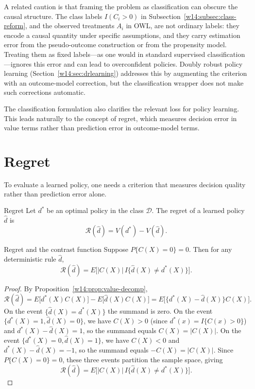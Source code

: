 \documentclass[master.tex]{subfiles}
\begin{document}
A related caution is that framing the problem as classification can obscure the causal structure. The class labels \(I(C_i>0)\) in Subsection~\ref{w14:subsec:class-reform}, and the observed treatments \(A_i\) in OWL, are not ordinary labels: they encode a causal quantity under specific assumptions, and they carry estimation error from the pseudo-outcome construction or from the propensity model. Treating them as fixed labels---as one would in standard supervised classification---ignores this error and can lead to overconfident policies. Doubly robust policy learning (Section~\ref{w14:sec:drlearning}) addresses this by augmenting the criterion with an outcome-model correction, but the classification wrapper does not make such corrections automatic.

The classification formulation also clarifies the relevant loss for policy learning. This leads naturally to the concept of regret, which measures decision error in value terms rather than prediction error in outcome-model terms.

\section{Regret}
\label{w14:sec:regret}

To evaluate a learned policy, one needs a criterion that measures decision quality rather than prediction error alone.

\begin{defn}{Regret}
\label{w14:defn:regret}
Let \(d^\ast\) be an optimal policy in the class \(\mathcal D\). The regret of a learned policy \(\hat d\) is
\[
\mathcal R(\hat d)=V(d^\ast)-V(\hat d).
\]
\end{defn}

\begin{prop}{Regret and the contrast function}
\label{w14:prop:regret-contrast}
Suppose \(P\{C(X)=0\}=0\). Then for any deterministic rule \(\hat d\),
\[
\mathcal R(\hat d)=E\bigl[|C(X)|\,I\{\hat d(X)\neq d^\ast(X)\}\bigr].
\]
\end{prop}

\begin{proof}
By Proposition~\ref{w14:prop:value-decomp},
\[
\mathcal R(\hat d)
=E\bigl[d^\ast(X)C(X)\bigr]-E\bigl[\hat d(X)C(X)\bigr]
=E\bigl[\{d^\ast(X)-\hat d(X)\}C(X)\bigr].
\]
On the event \(\{\hat d(X)=d^\ast(X)\}\) the summand is zero.
On the event \(\{d^\ast(X)=1,\hat d(X)=0\}\), we have \(C(X)>0\) (since
\(d^\ast(x)=I\{C(x)>0\}\)) and \(d^\ast(X)-\hat d(X)=1\), so the summand
equals \(C(X)=|C(X)|\).
On the event \(\{d^\ast(X)=0,\hat d(X)=1\}\), we have \(C(X)<0\) and
\(d^\ast(X)-\hat d(X)=-1\), so the summand equals \(-C(X)=|C(X)|\).
Since \(P\{C(X)=0\}=0\), these three events partition the sample space, giving
\[
\mathcal R(\hat d)
=E\bigl[|C(X)|\,I\{\hat d(X)\neq d^\ast(X)\}\bigr].
\]
\end{proof}
\end{document}
